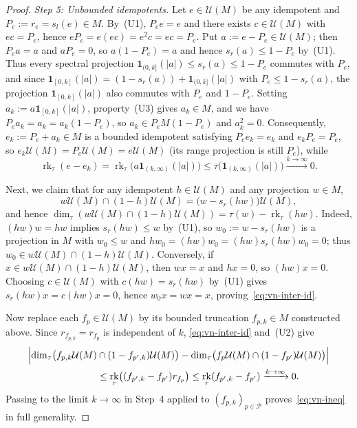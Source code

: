 \documentclass[11pt]{article}
\theoremstyle{definition}
\theoremstyle{remark}
\numberwithin{equation}{section}
\DeclareMathOperator{\rk}{rk}
\newcommand{\U}{\mathcal{U}}
\newcommand{\PP}{\mathcal{P}}
\newcommand{\1}{\mathbf{1}}
\begin{document}
\begin{proof}
\emph{Step 5: Unbounded idempotents.}
Let $e \in \U(M)$ be any idempotent and $P_e := r_e = s_l(e) \in M$. By~(U1), $P_e e = e$ and there exists $c \in \U(M)$ with $ec = P_e$, hence $e P_e = e(ec) = e^2 c = ec = P_e$. Put $a := e - P_e \in \U(M)$; then $P_e a = a$ and $a P_e = 0$, so $a(1 - P_e) = a$ and hence $s_r(a) \le 1 - P_e$ by~(U1). Thus every spectral projection $\1_{(0,k]}(|a|) \le s_r(a) \le 1 - P_e$ commutes with $P_e$, and since $\1_{[0,k]}(|a|) = (1 - s_r(a)) + \1_{(0,k]}(|a|)$ with $P_e \le 1 - s_r(a)$, the projection $\1_{[0,k]}(|a|)$ also commutes with $P_e$ and $1 - P_e$. Setting $a_k := a \1_{[0,k]}(|a|)$, property~(U3) gives $a_k \in M$, and we have $P_e a_k = a_k = a_k(1 - P_e)$, so $a_k \in P_e M (1 - P_e)$ and $a_k^2 = 0$. Consequently, $e_k := P_e + a_k \in M$ is a bounded idempotent satisfying $P_e e_k = e_k$ and $e_k P_e = P_e$, so $e_k \U(M) = P_e\U(M) = e\U(M)$ (its range projection is still $P_e$), while
\[
\rk_\tau(e - e_k) = \rk_\tau\bigl(a\1_{(k,\infty)}(|a|)\bigr) \le \tau\bigl(\1_{(k,\infty)}(|a|)\bigr) \xrightarrow{k \to \infty} 0.
\]

Next, we claim that for any idempotent $h \in \U(M)$ and any projection $w \in M$,
\begin{equation}
\label{eq:vn-inter-id}
w\U(M) \cap (1 - h)\U(M) = \bigl(w - s_r(hw)\bigr)\U(M),
\end{equation}
and hence $\dim_\tau(w\U(M) \cap (1 - h)\U(M)) = \tau(w) - \rk_\tau(hw)$. Indeed, $(hw)w = hw$ implies $s_r(hw) \le w$ by~(U1), so $w_0 := w - s_r(hw)$ is a projection in $M$ with $w_0 \le w$ and $h w_0 = (hw) w_0 = (hw) s_r(hw) w_0 = 0$; thus $w_0 \in w\U(M) \cap (1 - h)\U(M)$. Conversely, if $x \in w\U(M) \cap (1 - h)\U(M)$, then $wx = x$ and $hx = 0$, so $(hw)x = 0$. Choosing $c \in \U(M)$ with $c(hw) = s_r(hw)$ by~(U1) gives $s_r(hw) x = c(hw)x = 0$, hence $w_0 x = wx = x$, proving~\eqref{eq:vn-inter-id}.

Now replace each $f_p \in \U(M)$ by its bounded truncation $f_{p,k} \in M$ constructed above. Since $r_{f_{p,k}} = r_{f_p}$ is independent of $k$, \eqref{eq:vn-inter-id} and~(U2) give
\begin{align*}
\Bigl|\dim_\tau\bigl(f_{p,k}\U(M) &\cap (1 - f_{p',k})\U(M)\bigr)
 - \dim_\tau\bigl(f_p\U(M) \cap (1 - f_{p'})\U(M)\bigr)\Bigr| \\
&\le \rk_\tau\bigl((f_{p',k} - f_{p'}) r_{f_p}\bigr)
\le \rk_\tau(f_{p',k} - f_{p'}) \xrightarrow{k \to \infty} 0.
\end{align*} Passing to the limit $k \to \infty$ in Step~4 applied to $(f_{p,k})_{p \in \PP}$ proves~\eqref{eq:vn-ineq} in full generality.
\end{proof}
\end{document}
